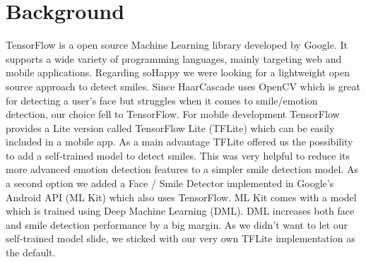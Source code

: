 \section{Background} \label{sec:background}
TensorFlow is a open source Machine Learning library developed by Google.
It supports a wide variety of programming languages, mainly targeting web and mobile applications.
Regarding soHappy we were looking for a lightweight open source approach to detect smiles. Since HaarCascade uses OpenCV which is great for detecting a user's face but struggles when it comes to smile/emotion detection, our choice fell to TensorFlow.
For mobile development TensorFlow provides a Lite version called TensorFlow Lite (TFLite) which can be easily included in a mobile app.
As a main advantage TFLite offered us the possibility to add a self-trained model to detect smiles. This was very helpful to reduce its more advanced emotion detection features to a simpler smile detection model.
As a second option we added a Face / Smile Detector implemented in Google's Android API (ML Kit) which also uses TensorFlow.
ML Kit comes with a model which is trained using Deep Machine Learning (DML).
DML increases both face and smile detection performance by a big margin.
As we didn't want to let our self-trained model slide, we sticked with our very own TFLite implementation as the default.
